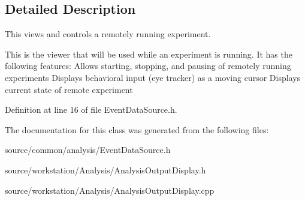 \subsection{Detailed Description}
This views and controls a remotely running experiment. 

This is the viewer that will be used while an experiment is running. It has the following features\-: Allows starting, stopping, and pausing of remotely running experiments Displays behavioral input (eye tracker) as a moving cursor Displays current state of remote experiment 

Definition at line 16 of file Event\-Data\-Source.\-h.



The documentation for this class was generated from the following files\-:\begin{DoxyCompactItemize}
\item 
source/common/analysis/Event\-Data\-Source.\-h\item 
source/workstation/\-Analysis/Analysis\-Output\-Display.\-h\item 
source/workstation/\-Analysis/Analysis\-Output\-Display.\-cpp\end{DoxyCompactItemize}
